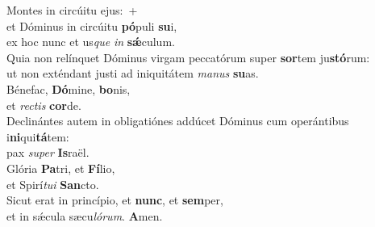 \evenverse Montes in circúitu ejus:~+\\\evenverse  et Dóminus in circúitu \textbf{pó}puli \textbf{su}i,~\*\\
\evenverse ex hoc nunc et us\textit{que} \textit{in} \textbf{sǽ}culum.\\
\oddverse Quia non relínquet Dóminus virgam peccatórum super \textbf{sor}tem ju\textbf{stó}rum:~\*\\
\oddverse ut non exténdant justi ad iniquitátem \textit{ma}\textit{nus} \textbf{su}as.\\
\evenverse Bénefac, \textbf{Dó}mine, \textbf{bo}nis,~\*\\
\evenverse et \textit{re}\textit{ctis} \textbf{cor}de.\\
\oddverse Declinántes autem in obligatiónes addúcet Dóminus cum operántibus i\textbf{ni}qui\textbf{tá}tem:~\*\\
\oddverse pax \textit{su}\textit{per} \textbf{Is}raël.\\
\evenverse Glória \textbf{Pa}tri, et \textbf{Fí}lio,~\*\\
\evenverse et Spirí\textit{tu}\textit{i} \textbf{San}cto.\\
\oddverse Sicut erat in princípio, et \textbf{nunc}, et \textbf{sem}per,~\*\\
\oddverse et in sǽcula sæcu\textit{ló}\textit{rum}. \textbf{A}men.\\
